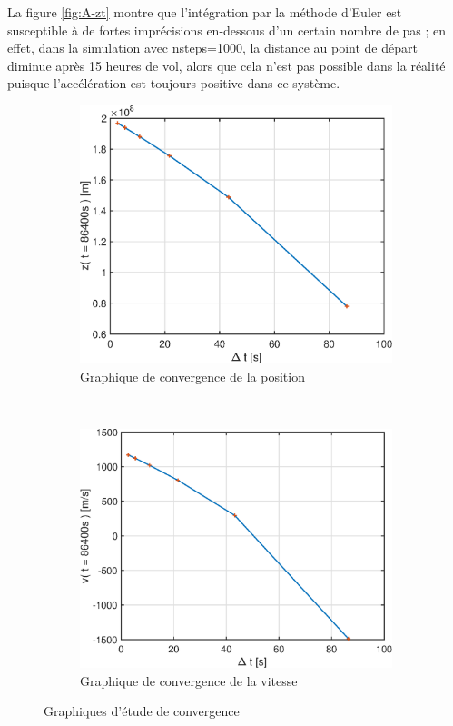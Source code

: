\documentclass[a4paper,12pt,twoside]{article}
\begin{document}
La figure \ref{fig:A-zt} montre que l'intégration par la méthode d'Euler est susceptible à de fortes imprécisions en-dessous d'un certain nombre de pas ;
en effet, dans la simulation avec nsteps=1000, la distance au point de départ diminue après 15 heures de vol, alors que cela n'est pas possible dans la réalité puisque l'accélération est toujours positive dans ce système.\\

\begin{figure}[h]
	\centering
	\begin{subfigure}[b]{0.45\textwidth}
		\includegraphics[width=\textwidth]{graphs/zConvA.eps}
		\caption{Graphique de convergence de la position}
		\label{fig:A-zConv}
	\end{subfigure}
	~
	\begin{subfigure}[b]{0.45\textwidth}
		\includegraphics[width=\textwidth]{graphs/vConvA.eps}
		\caption{Graphique de convergence de la vitesse}
		\label{fig:A-vConv}
	\end{subfigure}
	\caption{Graphiques d'étude de convergence}
	\label{fig:A-conv}
\end{figure}
\end{document}
